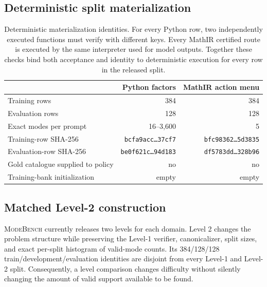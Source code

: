 \documentclass{article}
\newcommand{\1}{\mathbf 1}
\newcommand{\mb}{\textsc{ModeBench}}
\theoremstyle{remark}
\theoremstyle{definition}
\theoremstyle{plain}
\begin{document}
\subsection{Deterministic split materialization}
\label{app:data-materialization}

\begin{table}[H]
\centering
\caption{Deterministic materialization identities. For every Python row, two
independently executed functions must verify with different keys. Every MathIR
certified route is executed by the same interpreter used for model outputs.
Together these checks bind both acceptance and identity to deterministic
execution for every row in the released split.}
\label{tab:materialization-identities}
\small
\begin{tabular}{@{}lrr@{}}
\toprule
& \textbf{Python factors} & \textbf{MathIR action menu} \\
\midrule
Training rows & 384 & 384 \\
Evaluation rows & 128 & 128 \\
Exact modes per prompt & 16--3,600 & 5 \\
Training-row SHA-256 & \texttt{bcfa9acc\ldots37cf7} & \texttt{bfc98362\ldots5d3835} \\
Evaluation-row SHA-256 & \texttt{be0f621c\ldots94d183} & \texttt{df5783dd\ldots328b96} \\
Gold catalogue supplied to policy & no & no \\
Training-bank initialization & empty & empty \\
\bottomrule
\end{tabular}
\end{table}

\subsection{Matched Level-2 construction}
\label{app:data-levels}

\mb{} currently releases two levels for each domain. Level 2 changes the
problem structure while preserving the Level-1 verifier, canonicalizer, split
sizes, and exact per-split histogram of valid-mode counts. Its 384/128/128
train/development/evaluation identities are disjoint from every Level-1 and
Level-2 split. Consequently, a level comparison changes difficulty without
silently changing the amount of valid support available to be found.
\end{document}
